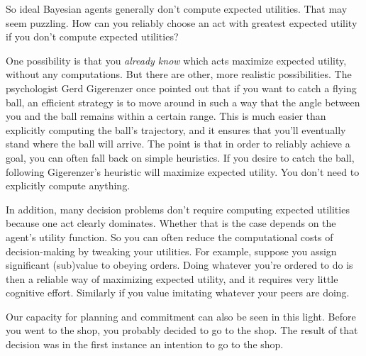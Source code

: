 So ideal Bayesian agents generally don't compute expected
utilities. That may seem puzzling. How can you reliably choose an
act with greatest expected utility if you don't compute expected
utilities?

One possibility is that you \emph{already know} which acts maximize
expected utility, without any computations. But there are other, more
realistic possibilities. The psychologist Gerd Gigerenzer once pointed
out that if you want to catch a flying ball, an efficient strategy is
to move around in such a way that the angle between you and the ball
remains within a certain range. This is much easier than explicitly
computing the ball's trajectory, and it ensures that you'll eventually
stand where the ball will arrive. The point is that in order to
reliably achieve a goal, you can often fall back on simple
heuristics. If you desire to catch the ball, following Gigerenzer's
heuristic will maximize expected utility. You don't need to explicitly
compute anything.

In addition, many decision problems don't require computing expected
utilities because one act clearly dominates. Whether that is the case
depends on the agent's utility function. So you can often reduce the
computational costs of decision-making by tweaking your utilities. For
example, suppose you assign significant (sub)value to obeying
orders. Doing whatever you're ordered to do is then a reliable way of
maximizing expected utility, and it requires very little cognitive
effort. Similarly if you value imitating whatever your peers are
doing.


Our capacity for planning and commitment can also be seen in this
light. Before you went to the shop, you probably decided to go to the
shop. The result of that decision was in the first instance an
intention to go to the shop.


